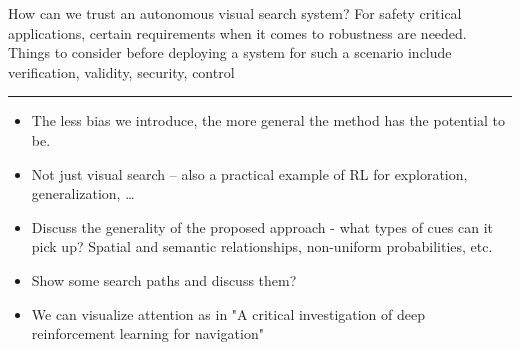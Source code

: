 How can we trust an autonomous visual search system?
For safety critical applications, certain requirements when it comes to robustness are needed.
Things to consider before deploying a system for such a scenario include verification, validity, security, control




\rule{5cm}{1pt}

\begin{itemize}
    \item The less bias we introduce, the more general the method has the potential to be.
    \item Not just visual search -- also a practical example of RL for exploration, generalization, \dots
    \item Discuss the generality of the proposed approach - what types of cues can it pick up? Spatial and semantic relationships, non-uniform probabilities, etc. 
    \item Show some search paths and discuss them?
    \item We can visualize attention as in "A critical investigation of deep reinforcement learning for navigation"
\end{itemize}

